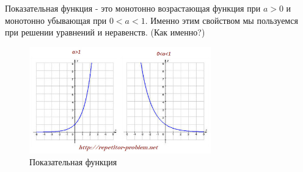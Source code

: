 Показательная функция - это монотонно возрастающая функция при $a>0$ и монотонно убывающая при $0<a<1$. Именно этим свойством мы пользуемся при решении уравнений и неравенств. (Как именно?)

\begin{figure}[h!]
	\centering
	\includegraphics[width=0.7\textwidth]{img/pokaz.jpg}
	\caption{Показательная функция}
\end{figure}